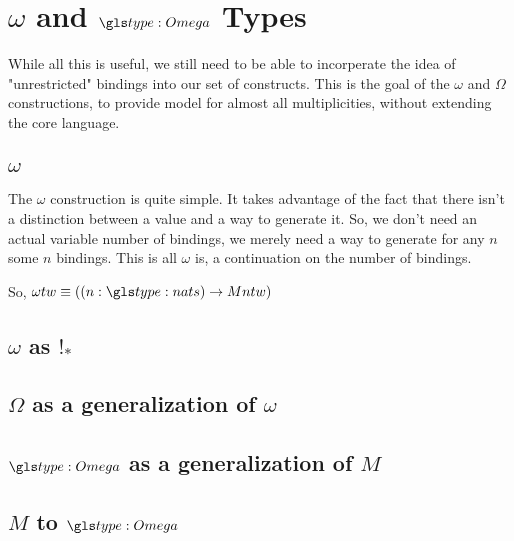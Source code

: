 \section{$\omega$ and $\tomega$ Types}

While all this is useful, we still need to be able to incorperate the idea of "unrestricted" bindings into our set of constructs.
This is the goal of the $\omega$ and $\Omega$ constructions, to provide model for almost all multiplicities, without extending the core language.

\subsection{$\omega$}

The $\omega$ construction is quite simple.
It takes advantage of the fact that there isn't a distinction between a value and a way to generate it.
So, we don't need an actual variable number of bindings, we merely need a way to generate for any $n$ some $n$ bindings. 
This is all $\omega$ is, a continuation on the number of bindings.

So, $\omega t w \equiv ((n : \nat) \to M n t w)$ 
\subsection{$\omega$ as $!_*$}

\subsection{$\Omega$ as a generalization of $\omega$}

\subsection{$\tomega$ as a generalization of $M$}

\subsection{$M$ to $\tomega$}